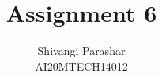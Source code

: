 \documentclass[journal,12pt,twocolumn]{IEEEtran}
\begin{document}
\makeatletter
{}
\makeatother
\let\StandardTheFigure\thefigure
\let\vec\mathbf
\renewcommand{\thefigure}{\theproblem}
\def\putbox#1#2#3{\makebox[0in][l]{\makebox[#1][l]{}\raisebox{\baselineskip}[0in][0in]{\raisebox{#2}[0in][0in]{#3}}}}
     \def\rightbox#1{\makebox[0in][r]{#1}}
     \def\centbox#1{\makebox[0in]{#1}}
     \def\topbox#1{\raisebox{-\baselineskip}[0in][0in]{#1}}
     \def\midbox#1{\raisebox{-0.5\baselineskip}[0in][0in]{#1}}
\vspace{3cm}
\title{Assignment 6}
\author{Shivangi Parashar\\AI20MTECH14012}
%
%
%
% 
%
\end{document}

